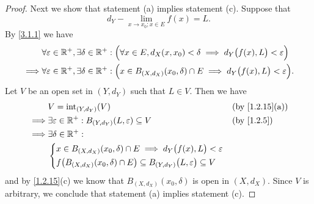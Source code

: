 \begin{proof}
  Next we show that statement (a) implies statement (c).
  Suppose that
  \[
    d_Y - \lim_{x \to x_0 ; x \in E} f(x) = L.
  \]
  By \cref{3.1.1} we have
  \begin{align*}
             & \forall \varepsilon \in \mathbb{R}^+, \exists \delta \in \mathbb{R}^+ : \Big(\forall x \in E, d_X(x, x_0) < \delta \implies d_Y\big(f(x), L\big) < \varepsilon\Big)   \\
    \implies & \forall \varepsilon \in \mathbb{R}^+, \exists \delta \in \mathbb{R}^+ : \Big(x \in B_{(X, d_X)}(x_0, \delta) \cap E \implies d_Y\big(f(x), L\big) < \varepsilon\Big).
  \end{align*}
  Let \(V\) be an open set in \((Y, d_Y)\) such that \(L \in V\).
  Then we have
  \begin{align*}
             & V = \text{int}_{(Y, d_Y)}(V)                                                                           &  & \text{(by \cref{1.2.15}(a))} \\
    \implies & \exists \varepsilon \in \R^+ : B_{(Y, d_Y)}(L, \varepsilon) \subseteq V                                &  & \by{1.2.5}                   \\
    \implies & \exists \delta \in \R^+ :                                                                                                                \\
             & \begin{dcases}
                 x \in B_{(X, d_X)}(x_0, \delta) \cap E \implies d_Y\big(f(x), L\big) < \varepsilon \\
                 f\big(B_{(X, d_X)}(x_0, \delta) \cap E\big) \subseteq B_{(Y, d_Y)}\big(L, \varepsilon\big) \subseteq V
               \end{dcases}
  \end{align*}
  and by \cref{1.2.15}(c) we know that \(B_{(X, d_X)}(x_0, \delta)\) is open in \((X, d_X)\).
  Since \(V\) is arbitrary, we conclude that statement (a) implies statement (c).


\end{proof}
